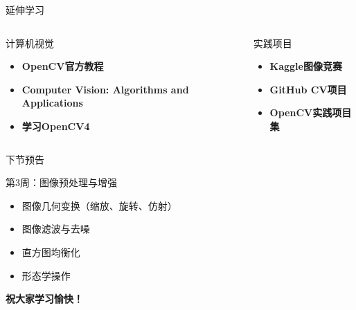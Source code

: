 \documentclass[aspectratio=169, 10pt]{beamer}
\begin{document}
\begin{frame}{延伸学习}
	\begin{columns}
		\begin{block}{计算机视觉}
			\begin{itemize}
				\item \textbf{OpenCV官方教程}
				\item \textbf{Computer Vision: Algorithms and Applications}
				\item \textbf{学习OpenCV4}
			\end{itemize}
		\end{block}

		\begin{block}{实践项目}
			\begin{itemize}
				\item \textbf{Kaggle图像竞赛}
				\item \textbf{GitHub CV项目}
				\item \textbf{OpenCV实践项目集}
			\end{itemize}
		\end{block}
	\end{columns}
\end{frame}

\begin{frame}{下节预告}
	\begin{block}{第3周：图像预处理与增强}
		\begin{itemize}
			\item 图像几何变换（缩放、旋转、仿射）
			\item 图像滤波与去噪
			\item 直方图均衡化
			\item 形态学操作
		\end{itemize}
	\end{block}

	\vspace{0.5cm}

	\begin{center}
		\textbf{祝大家学习愉快！}
	\end{center}
\end{frame}
\end{document}
